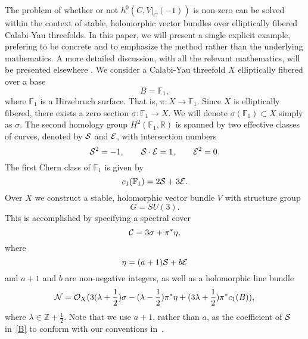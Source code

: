 \documentclass[a4paper,12pt]{article}
\numberwithin{equation}{section}
\theoremstyle{plain}
\begin{document}
The problem of whether or not $h^{0} (C, V|_{C} (-1))$ is non-zero
can be solved within the context of stable, holomorphic vector bundles
over
elliptically fibered Calabi-Yau threefolds. In this paper, we will present
a single explicit example, prefering to be concrete and to emphasize the
method rather than the underlying mathematics. A more detailed discussion,
with all the relevant mathematics, will be presented elsewhere
\cite{BDOnew}.
We consider a Calabi-Yau threefold $X$ elliptically fibered over a base
%
\begin{equation}
B={\mathbb F}_1,
\label{33}
\end{equation}
%
where ${\mathbb F}_1$ is a Hirzebruch surface. That is,
$\pi:X \to {\mathbb F}_1$. Since $X$ is elliptically fibered, there exists
a zero section $\sigma : {\mathbb F}_1 \to X$. We will denote
$\sigma({\mathbb F}_1) \subset X$ simply as $\sigma$.
The second homology group $H^{2}({\mathbb F}_1, {\mathbb R})$ is spanned
by two effective classes of curves, denoted by ${\cal S}$ and ${\cal E}$,
with
intersection numbers
%
\begin{equation}
{\cal S}^2 = -1, \qquad {\cal S} \cdot {\cal E} = 1, \qquad
{\cal E}^2 =0.
\label{aaa}
\end{equation}
%
The first Chern class of ${\mathbb F}_1$ is given by
%
\begin{equation}
c_1 ({\mathbb F}_1) = 2{\cal S} + 3{\cal E}.
\label{A}
\end{equation}
%
Over $X$ we construct a stable, holomorphic vector bundle $V$ with
structure
group
%
\begin{equation}
G=SU(3).
\label{34}
\end{equation}
%
This is accomplished \cite{FMW,DO} by specifying a spectral cover
%
\begin{equation}
{\cal C} = 3 \sigma + \pi^{*} \eta ,
\label{35}
\end{equation}
%
where
%
\begin{equation}
\eta = (a+1) {\cal S} + b{\cal E}
\label{B}
\end{equation}
%
and $a+1$ and $b$ are non-negative integers, as well as a holomorphic line
bundle
%
\begin{equation}
{\cal N} = {\cal O}_{X} ( 3(\lambda +\frac{1}{2}) \sigma  -
(\lambda -\frac{1}{2}) \pi^{*}\eta + (3 \lambda +\frac{1}{2})
\pi^{*}c_1(B)),
\label{C}
\end{equation}
%
where $\lambda \in {\mathbb Z}+\frac{1}{2}$.
Note that we use $a+1$, rather than $a$, as the coefficient of ${\cal{S}}$
in~\eqref{B} to conform with our conventions in~\cite{BDOold}.
\end{document}
